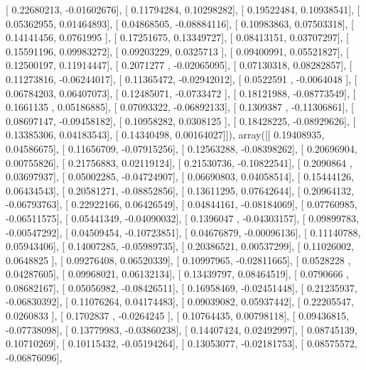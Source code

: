 \documentclass{article}
\begin{document}
       [ 0.22680213, -0.01602676],
       [ 0.11794284,  0.10298282],
       [ 0.19522484,  0.10938541],
       [ 0.05362955,  0.01464893],
       [ 0.04868505, -0.08884116],
       [ 0.10983863,  0.07503318],
       [ 0.14141456,  0.0761995 ],
       [ 0.17251675,  0.13349727],
       [ 0.08413151,  0.03707297],
       [ 0.15591196,  0.09983272],
       [ 0.09203229,  0.0325713 ],
       [ 0.09400991,  0.05521827],
       [ 0.12500197,  0.11914447],
       [ 0.2071277 , -0.02065095],
       [ 0.07130318,  0.08282857],
       [ 0.11273816, -0.06244017],
       [ 0.11365472, -0.02942012],
       [ 0.0522591 , -0.0064048 ],
       [ 0.06784203,  0.06407073],
       [ 0.12485071, -0.0733472 ],
       [ 0.18121988, -0.08773549],
       [ 0.1661135 ,  0.05186885],
       [ 0.07093322, -0.06892133],
       [ 0.1309387 , -0.11306861],
       [ 0.08697147, -0.09458182],
       [ 0.10958282,  0.0308125 ],
       [ 0.18428225, -0.08929626],
       [ 0.13385306,  0.04183543],
       [ 0.14340498,  0.00164027]]), array([[ 0.19408935,  0.04586675],
       [ 0.11656709, -0.07915256],
       [ 0.12563288, -0.08398262],
       [ 0.20696904,  0.00755826],
       [ 0.21756883,  0.02119124],
       [ 0.21530736, -0.10822541],
       [ 0.2090864 ,  0.03697937],
       [ 0.05002285, -0.04724907],
       [ 0.06690803,  0.04058514],
       [ 0.15444126,  0.06434543],
       [ 0.20581271, -0.08852856],
       [ 0.13611295,  0.07642644],
       [ 0.20964132, -0.06793763],
       [ 0.22922166,  0.06426549],
       [ 0.04844161, -0.08184069],
       [ 0.07760985, -0.06511575],
       [ 0.05441349, -0.04090032],
       [ 0.1396047 , -0.04303157],
       [ 0.09899783, -0.00547292],
       [ 0.04509454, -0.10723851],
       [ 0.04676879, -0.00096136],
       [ 0.11140788,  0.05943406],
       [ 0.14007285, -0.05989735],
       [ 0.20386521,  0.00537299],
       [ 0.11026002,  0.0648825 ],
       [ 0.09276408,  0.06520339],
       [ 0.10997965, -0.02811665],
       [ 0.0528228 ,  0.04287605],
       [ 0.09968021,  0.06132134],
       [ 0.13439797,  0.08464519],
       [ 0.0790666 ,  0.08682167],
       [ 0.05056982, -0.08426511],
       [ 0.16958469, -0.02451448],
       [ 0.21235937, -0.06830392],
       [ 0.11076264,  0.04174483],
       [ 0.09039082,  0.05937442],
       [ 0.22205547,  0.0260833 ],
       [ 0.1702837 , -0.0264245 ],
       [ 0.10764435,  0.00798118],
       [ 0.09436815, -0.07738098],
       [ 0.13779983, -0.03860238],
       [ 0.14407424,  0.02492997],
       [ 0.08745139,  0.10710269],
       [ 0.10115432, -0.05194264],
       [ 0.13053077, -0.02181753],
       [ 0.08575572, -0.06876096],
\end{document}
